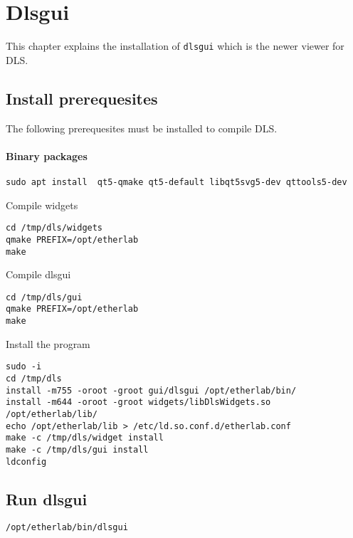 \chapter{Dlsgui}

\label{chap:dlsgui}
This chapter explains the installation of \texttt{dlsgui} which is the
newer viewer for DLS.

\section{Install prerequesites}

The following prerequesites must be installed to compile DLS.

\subsubsection{Binary packages}
\begin{verbatim}
sudo apt install  qt5-qmake qt5-default libqt5svg5-dev qttools5-dev

\end{verbatim}

\noindent Compile widgets

\begin{verbatim}
cd /tmp/dls/widgets
qmake PREFIX=/opt/etherlab
make
\end{verbatim}


\noindent Compile dlsgui
\begin{verbatim}
cd /tmp/dls/gui
qmake PREFIX=/opt/etherlab
make
\end{verbatim}

\noindent Install the program

\begin{verbatim}
sudo -i
cd /tmp/dls
install -m755 -oroot -groot gui/dlsgui /opt/etherlab/bin/
install -m644 -oroot -groot widgets/libDlsWidgets.so  /opt/etherlab/lib/
echo /opt/etherlab/lib > /etc/ld.so.conf.d/etherlab.conf
make -c /tmp/dls/widget install
make -c /tmp/dls/gui install
ldconfig
\end{verbatim}



\section{Run dlsgui}


\begin{verbatim}
/opt/etherlab/bin/dlsgui
\end{verbatim}

